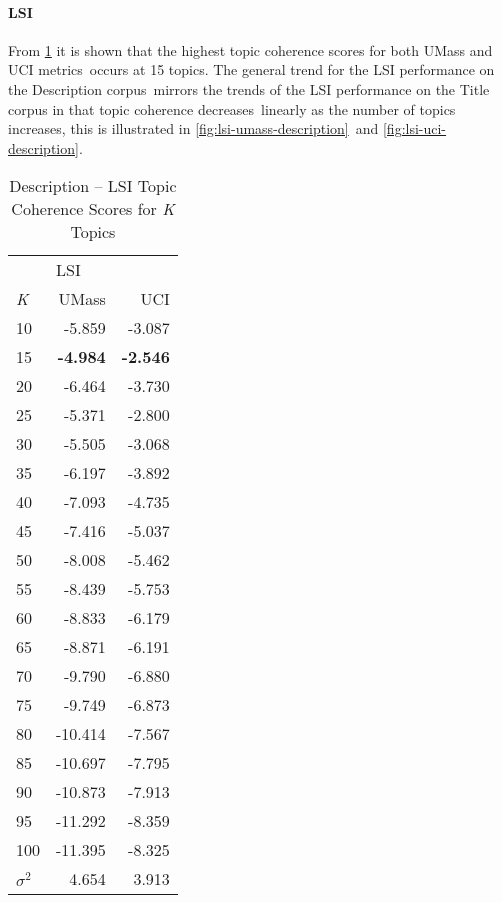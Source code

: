 \documentclass[letterpaper,12pt]{article}
\begin{document}


\newpage
\paragraph{LSI}
From \ref{tab:lsi_tc_scores} it is shown that the highest topic coherence scores for both UMass and UCI metrics\
occurs at 15 topics. The general trend for the LSI performance on the Description corpus\
mirrors the trends of the LSI performance on the Title corpus in that topic coherence decreases\
linearly as the number of topics increases, this is illustrated in \ref{fig:lsi-umass-description}\
and \ref{fig:lsi-uci-description}.

\begin{table}
	\caption{\label{tab:lsi_tc_scores} Description -- LSI Topic Coherence Scores for \emph{K} Topics}
	\begin{center}
		\begin{tabular}{lrr}
			\toprule
			{} & \multicolumn{2}{l}{LSI} \\
			\emph{K} &   UMass &    UCI \\
			\midrule
			10  &  -5.859 & -3.087 \\
			15  &  \textbf{-4.984} & \textbf{-2.546} \\
			20  &  -6.464 & -3.730 \\
			25  &  -5.371 & -2.800 \\
			30  &  -5.505 & -3.068 \\
			35  &  -6.197 & -3.892 \\
			40  &  -7.093 & -4.735 \\
			45  &  -7.416 & -5.037 \\
			50  &  -8.008 & -5.462 \\
			55  &  -8.439 & -5.753 \\
			60  &  -8.833 & -6.179 \\
			65  &  -8.871 & -6.191 \\
			70  &  -9.790 & -6.880 \\
			75  &  -9.749 & -6.873 \\
			80  & -10.414 & -7.567 \\
			85  & -10.697 & -7.795 \\
			90  & -10.873 & -7.913 \\
			95  & -11.292 & -8.359 \\
			100 & -11.395 & -8.325 \\
			\midrule
			$\sigma^2$ & 4.654 & 3.913 \\
			\bottomrule
			\end{tabular}
	\end{center}
\end{table}
\end{document}
